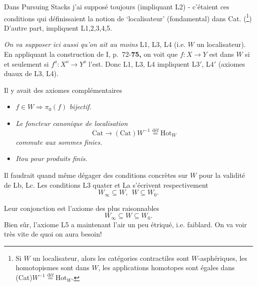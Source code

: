 \documentclass[11pt]{article}
\newcommand{\printedpage}[1]{\marginpar{\footnotesize p.~#1}}
\newcommand{\msp}[1]{\marginpar{\footnotesize [#1]}}
\newcommand{\deq}{\overset{\text{déf}}{=}}
\begin{document}
\noindent Dans Pursuing Stacks j'ai supposé toujours  (impliquant L2) - c'étaient ces conditions qui définissaient la notion de `localisateur' (fondamental) dans Cat. (\footnote[4]{Si $W$ un localisateur, alors les catégories contractiles sont $W$-asphériques, les homotopismes sont dans $W$, les applications homotopes sont égales dans (Cat)$W^{-1} \deq \mathrm{Hot}_W$.}) D'autre part,  impliquent L1,2,3,4,5.

\noindent\textit{On va supposer ici aussi qu'on ait au moins} L1, L3, L4 (i.e. $W$ un localisateur). En appliquant la construction de I, p.~72-\textbf{75,} on voit que $f : X \longrightarrow Y$ est dans $W$ si et seulement si $f^o : X^o \longrightarrow Y^o$ l'est. Donc L1, L3, L4 impliquent L3$'$, L4$'$ (axiomes duaux de L3, L4).

\noindent Il y avait des axiomes complémentaires

\begin{itemize}[leftmargin=2.5em]
\item[\textbf{La}] $f \in W \Longrightarrow \pi_0(f)$ \textit{bijectif.}

\item[\textbf{Lb}] \textit{Le foncteur canonique de localisation}
\[
\mathrm{Cat} \longrightarrow (\mathrm{Cat})W^{-1} \deq \mathrm{Hot}_W
\]
\textit{commute aux sommes finies.}

\item[\textbf{Lc}] \textit{Itou pour produits finis.}
\end{itemize}

\clearpage

\noindent\printedpage{3}
Il faudrait quand même dégager des conditions concrètes sur $W$ pour la validité de Lb, Lc. Les conditions L3 quater et La s'écrivent respectivement
\[
W_\infty \subseteq W,\ \ W \subseteq W_0.
\]

\noindent\msp{page 3}

\noindent Leur conjonction est l'axiome des plus raisonnables
\[
W_\infty \subseteq W \subseteq W_0.
\]
Bien sûr, l'axiome L5 a maintenant l'air un peu étriqué, i.e. faiblard. On va voir très vite de quoi on aura besoin!
\end{document}
